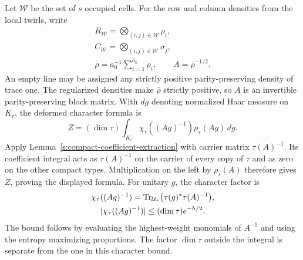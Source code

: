 Let $\mathcal W$ be the set of $s$ occupied cells.  For the row and
column densities from the local twirls, write
\[
 \begin{gathered}
 R_{\mathcal W}=\bigotimes_{(i,j)\in\mathcal W}\rho_i,\\
 C_{\mathcal W}=\bigotimes_{(i,j)\in\mathcal W}\sigma_j,\\
 \bar\rho=a_0^{-1}\sum_{i=1}^{a_0}\rho_i,\qquad
 A=\bar\rho^{-1/2}.
 \end{gathered}
\]
An empty line may be assigned any strictly positive parity-preserving
density of trace one.  The regularized densities make $\bar\rho$
strictly positive, so $A$ is an invertible parity-preserving block
matrix.  With $dg$ denoting normalized Haar measure on $K_r$, the
deformed character formula is
\begin{equation}\label{rec:graded-deformed-projector}
 Z=(\dim\tau)\int_{K_r}
          \chi_\tau((Ag)^{-1})\rho_s(Ag)\,dg.
\end{equation}
Apply Lemma~\ref{s:compact-coefficient-extraction} with carrier matrix
$\tau(A)^{-1}$. Its coefficient integral acts as
$\tau(A)^{-1}$ on the carrier of every copy of $\tau$ and as zero
on the other compact types. Multiplication on the left by
$\rho_s(A)$ therefore gives $Z$, proving the displayed formula.
For unitary $g$, the character factor is
\[
 \begin{gathered}
 \chi_\tau((Ag)^{-1})
 =\operatorname{Tr}_{\mathcal U_\tau}\bigl(\tau(g)^*\tau(A)^{-1}\bigr),\\
 |\chi_\tau((Ag)^{-1})|\le(\dim\tau)e^{-h/2}.
 \end{gathered}
\]
The bound follows by evaluating the highest-weight monomials of
$A^{-1}$ and using the entropy maximizing proportions.  The factor
$\dim\tau$ outside the integral is separate from the one in this
character bound.

